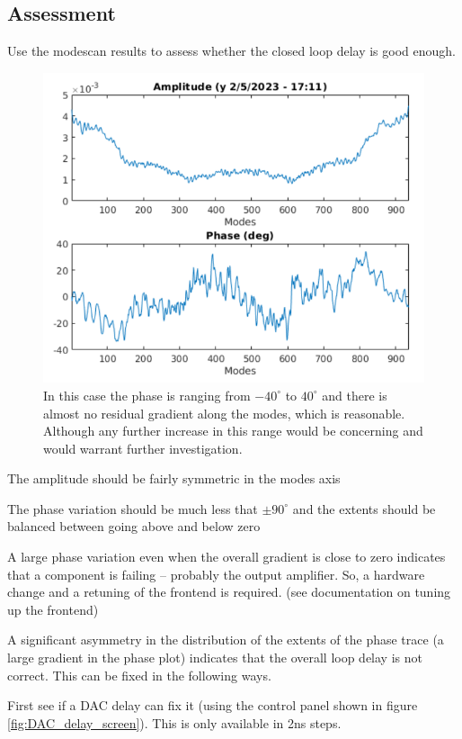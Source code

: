 \documentclass{report}
\begin{document}
\subsection{Assessment} 

Use the modescan results to assess whether the closed loop delay is good enough.
 
\begin{figure}[h]
    \centering
    \includegraphics[width=0.8\linewidth]{initial_modescan.png}
    \caption{In this case the phase is ranging from $-40^\circ$ to $40^\circ$ and there is almost no residual gradient along the modes, which is reasonable. Although any further increase in this range would be concerning and would warrant further investigation.}
    \label{fig:example_modescan}
\end{figure}
 
The amplitude should be fairly symmetric in the modes axis 

The phase variation should be much less that $\pm90^\circ$ and the extents should be balanced between going above and below zero 

A large phase variation even when the overall gradient is close to zero indicates that a component is failing – probably the output amplifier. So, a hardware change and a retuning of the frontend is required. (see documentation on tuning up the frontend)

A significant asymmetry in the distribution of the extents of the phase trace (a large gradient in the phase plot) indicates that the overall loop delay is not correct. This can be fixed in the following ways. 

First see if a DAC delay can fix it (using the control panel shown in figure \ref{fig:DAC_delay_screen}). This is only available in 2ns steps.
\end{document}
